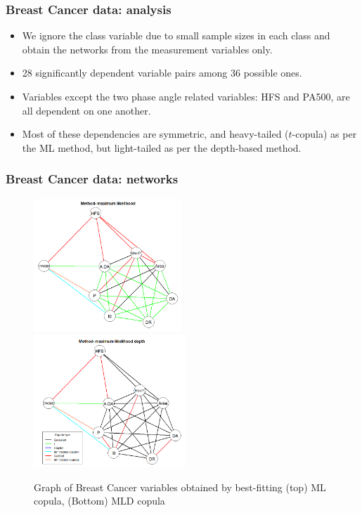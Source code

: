 \documentclass[handout,10pt]{beamer}
\begin{document}
\begin{frame}
\frametitle{Breast Cancer data: analysis}
\begin{itemize}
\item We ignore the class variable due to small sample sizes in each class and obtain the networks from the measurement variables only.
\vspace{.2cm}
\item 28 significantly dependent variable pairs among 36 possible ones.
\vspace{.2cm}
\item Variables except the two phase angle related variables: HFS and PA500, are all dependent on one another.
\vspace{.2cm}
\item Most of these dependencies are symmetric, and  heavy-tailed ($t$-copula) as per the ML method, but light-tailed as per the depth-based method.
\end{itemize}
\end{frame}

\begin{frame}
\frametitle{Breast Cancer data: networks}
\begin{figure}[t]
	\centering
		\includegraphics[height=5cm]{cancer_graph_ml.png}
		\includegraphics[height=5cm]{cancer_graph_md.png}
	\label{fig:fig2}
	\caption{Graph of Breast Cancer variables obtained by best-fitting (top) ML copula, (Bottom) MLD copula}
\end{figure}
\end{frame}
\end{document}
